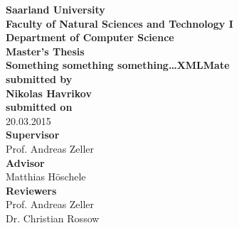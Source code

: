 \begin{titlepage}
\begin{center}
{\LARGE \bfseries Saarland University \\
Faculty of Natural Sciences and Technology I \\[0.1cm]
Department of Computer Science}\\[2.5cm]

{\Large \bfseries Master's Thesis}\\[1cm]
{\LARGE \bfseries Something something something\ldots XMLMate}\\[2cm]
{\small \bfseries submitted by}\\[0.5cm]
{\large \bfseries Nikolas Havrikov}\\[1cm]
{\small \bfseries submitted on}\\
20.03.2015\\[2.5cm]
{\bfseries Supervisor}\\[0.2cm]
Prof. Andreas Zeller\\[1cm]
{\bfseries Advisor}\\[0.2cm]
Matthias Höschele\\[1cm]
{\bfseries Reviewers}\\[0.2cm]
Prof. Andreas Zeller\\[.2cm]
Dr. Christian Rossow
\end{center}
\end{titlepage}